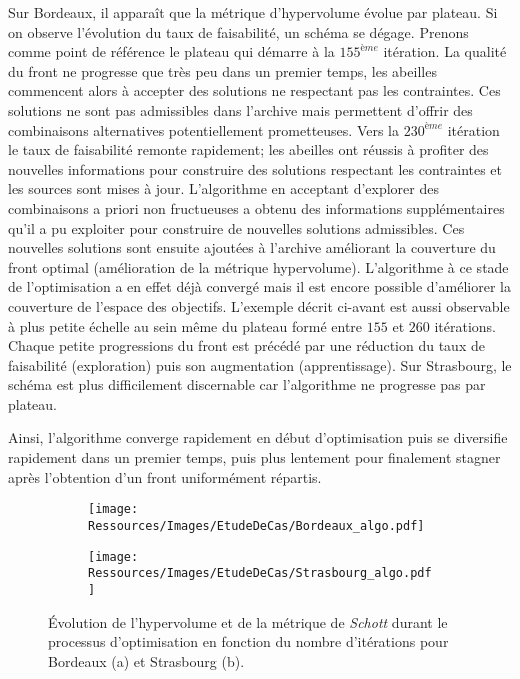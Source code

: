 Sur Bordeaux, il apparaît que la métrique d’hypervolume évolue par plateau. Si on observe
l’évolution du taux de faisabilité, un schéma se dégage. Prenons comme point de référence
le plateau qui démarre à la $155^{ème}$ itération. La qualité du front ne progresse que
très peu dans un premier temps, les abeilles commencent alors à accepter des solutions ne
respectant pas les contraintes. Ces solutions ne sont pas admissibles dans l’archive mais
permettent d’offrir des combinaisons alternatives potentiellement prometteuses. Vers la
$230^{ème}$ itération le taux de faisabilité remonte rapidement; les abeilles ont réussis à
profiter des nouvelles informations pour construire des solutions respectant les
contraintes et les sources sont mises à jour. L’algorithme en acceptant d’explorer des
combinaisons a priori non fructueuses a obtenu des informations supplémentaires
qu’il a pu exploiter pour construire de nouvelles solutions admissibles. Ces nouvelles
solutions sont ensuite ajoutées à l’archive améliorant la couverture du front optimal
(amélioration de la métrique hypervolume). L’algorithme à ce stade de l’optimisation a en
effet déjà convergé mais il est encore possible d’améliorer la couverture de l’espace des
objectifs.
L’exemple décrit ci-avant est aussi observable à plus petite échelle au sein même du plateau
formé entre $155$ et $260$ itérations. Chaque petite progressions du front est précédé par
une réduction du taux de faisabilité (exploration) puis son augmentation (apprentissage).
Sur Strasbourg, le schéma est plus difficilement discernable car l’algorithme ne progresse
pas par plateau.

Ainsi, l’algorithme converge rapidement en début d’optimisation puis se diversifie
rapidement dans un premier temps, puis plus lentement pour finalement stagner après
l’obtention d’un front uniformément répartis.

\begin{figure}
    \centering
    \begin{subfigure}[b]{0.48\textwidth}
        \centering
        \texttt{[image: Ressources/Images/EtudeDeCas/Bordeaux\_algo.pdf]}
        \caption{}
        \label{fig:hypervolume_schott_bor}
    \end{subfigure}
    \quad
    \begin{subfigure}[b]{0.48\textwidth}
        \centering
        \texttt{[image: Ressources/Images/EtudeDeCas/Strasbourg\_algo.pdf]}
        \caption{}
        \label{fig:hypervolume_schottstras}
    \end{subfigure}
    \caption[Évolution de la convergence et de la diversification de l’optimisation]
             {Évolution de l’hypervolume et de la métrique de \textit{Schott}
              durant le processus d’optimisation en fonction du nombre d’itérations pour
              Bordeaux (a) et Strasbourg (b).}
    \label{fig:hypervolume_schott_front}
\end{figure}




